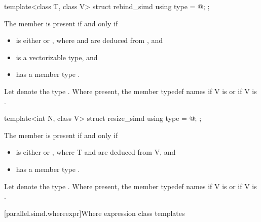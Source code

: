 \begin{itemdecl}
template<class T, class V> struct rebind_simd { using type = @\seebelow@; };
\end{itemdecl}

\begin{itemdescr}
  \pnum
  The member  is present if and only if
  \begin{itemize}
    \item {} is either  or , where  and  are deduced from , and
    \item {} is a vectorizable type, and
    \item {} has a member type .
  \end{itemize}

  \pnum
  Let  denote the type .
  Where present, the member typedef  names
   if \tcode V is  or
   if \tcode V is .
\end{itemdescr}

\begin{itemdecl}
template<int N, class V> struct resize_simd { using type = @\seebelow@; };
\end{itemdecl}

\begin{itemdescr}
  \pnum
  The member  is present if and only if
  \begin{itemize}
    \item {} is either  or , where \tcode T and  are deduced from \tcode V, and
    \item {} has a member type .
  \end{itemize}

  \pnum
  Let  denote the type .
  Where present, the member typedef  names  if \tcode V is  or  if \tcode V is .
\end{itemdescr}

[parallel.simd.whereexpr]{Where expression class templates}

